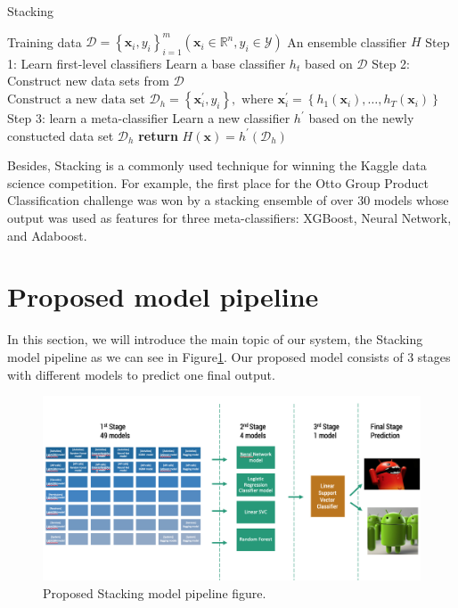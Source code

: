 \begin{algorithm}[htbp]
    \centering
    \caption{Stacking}
    \label{alg:algo1}
    \begin{algorithmic}[1]  
    \renewcommand{\algorithmicrequire}{\textbf{Input:}}
    \renewcommand{\algorithmicensure}{\textbf{Output:}}
    \Require Training data $\mathcal{D}=\left\{\mathbf{x}_{i}, y_{i}\right\}_{i=1}^{m}\left(\mathbf{x}_{i} \in \mathbb{R}^{n}, y_{i} \in \mathcal{Y}\right)$
    \Ensure An ensemble classifier $H$
    \State Step 1: Learn first-level classifiers
        \Statex Learn a base classifier $h_{t}$ based on $\mathcal{D}$
    \EndFor
    \State Step 2: Construct new data sets from $\mathcal{D}$
    \State $\text{Construct a new data set }\mathcal{D}_{h}=\left\{\mathbf{x}_{i}^{\prime}, y_{i}\right\}, \text { where } \mathbf{x}_{i}^{\prime}=\left\{h_{1}\left(\mathbf{x}_{i}\right), \ldots, h_{T}\left(\mathbf{x}_{i}\right)\right\}$
    \EndFor
    \State Step 3: learn a meta-classifier
    \State Learn a new classifier $h^{\prime}$ based on the newly constucted data set $\mathcal{D}_h$
    \State \textbf{return} $H(\mathbf{x})=h^{\prime}\left(\mathcal{D}_h\right)$
    \end{algorithmic}
\end{algorithm}

Besides, Stacking is a commonly used technique for winning the Kaggle data science competition. For example, the first place for the Otto Group Product Classification challenge was won by a stacking ensemble of over 30 models whose output was used as features for three meta-classifiers: XGBoost, Neural Network, and Adaboost.

\section{Proposed model pipeline} \label{model}

In this section, we will introduce the main topic of our system, the Stacking model pipeline as we can see in Figure\ref{fig:modelpipeline}. Our proposed model consists of 3 stages with different models to predict one final output.

\begin{figure}[htbp]
    \centering
    \includegraphics[width=\textwidth]{./Figure/modelpipeline.png}
    \caption{Proposed Stacking model pipeline figure.}
    \label{fig:modelpipeline}
\end{figure}

